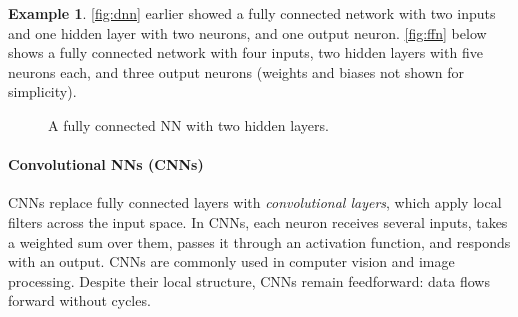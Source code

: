 \documentclass[oneside,11pt,dvipsnames]{book}
\numberwithin{equation}{section}
\theoremstyle{definition}
\newtheorem{example}{Example}[section]
\theoremstyle{remark}
\begin{document}
\begin{example}
\autoref{fig:dnn} earlier showed a fully connected network with two inputs and one hidden layer with two neurons, and one output neuron. \autoref{fig:ffn} below shows a fully connected network with four inputs, two hidden layers with five neurons each, and three output neurons (weights and biases not shown for simplicity).

\begin{figure}[htp]
    \centering
    \caption{A fully connected NN with two hidden layers.}
    \label{fig:ffn}
\end{figure}
\end{example}


\paragraph{Convolutional NNs (CNNs)} CNNs replace fully connected layers with \emph{convolutional layers}, which apply local filters across the input space. In CNNs, each neuron receives several inputs, takes a weighted sum over them, passes it through an activation function, and responds with an output.  CNNs are commonly used in computer vision and image processing. Despite their local structure, CNNs remain feedforward: data flows forward without cycles.
\end{document}
